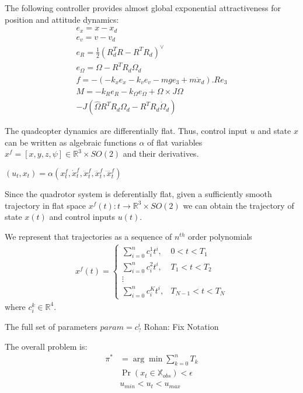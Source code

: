 \documentclass[conference]{IEEEtran}
\newcommand{\rohan}[1]{{\color{blue} Rohan: #1}}
\begin{document}
The following controller \cite{leegeometric} provides almost global exponential attractiveness for position and attitude dynamics:
\begin{gather}
    e_x = x - x_d \\
    e_v = v - v_d \\
    e_R = \frac{1}{2}(R^T_d R - R^T R_d)^{\vee} \\
    e_{\Omega} = \Omega - R^T R_d \Omega_d \\
    f = -(-k_x e_x - k_v e_v - mge_3 + m\ddot{x}_d).Re_3 \\
    \nonumber M = -k_R e_R - k_{\Omega} e_{\Omega} + \Omega \times J\Omega\\ - J (\hat{\Omega} R^T R_d \Omega_d - R^T R_d \dot{\Omega}_d)
\end{gather}

 The quadcopter dynamics are differentially flat. Thus, control input $u$ and state $x$ can be written as algebraic functions $\alpha$ of flat variables $x^f = [x, y, z, \psi] \in \mathbb{R}^3 \times SO(2)$ and their derivatives.

$(u_t, x_t) = \alpha(x_t^f,\dot{x}_t^f,\ddot{x}_t^f,\dddot{x}_t^f,\ddddot{x}_t^f)$

Since the quadrotor system is deferentially flat, given a sufficiently smooth trajectory in flat space $x^f(t): t \to \mathbb{R}^3\times SO(2)$ we can obtain the trajectory of state $x(t)$ and control inputs $u(t)$. 

We represent that trajectories as a sequence of $n^{th}$ order polynomials
\begin{align}
x^f(t) = 
\begin{cases}
    \sum_{i=0}^n c_i^1 t^i, & 0 < t < T_1 \\
    \sum_{i=0}^n c_i^2 t^i, & T_1 < t < T_2 \\
    \vdots\\
    \sum_{i=0}^n c_i^K t^i, & T_{N-1} < t < T_N
\end{cases}    
\end{align}
where $c^k_i\in\mathbb{R}^4$.

The full set of parameters
$param = c^i_?$
\rohan{Fix Notation}

 The overall problem is:
\begin{align}
\pi^{*} &= \arg\min \sum_{k=0}^n T_k\\
\nonumber & \Pr(x_t\in \mathbb{X}_{obs}) < \epsilon \\
\nonumber & u_{min} < u_t < u_{max}
\end{align}
\end{document}

